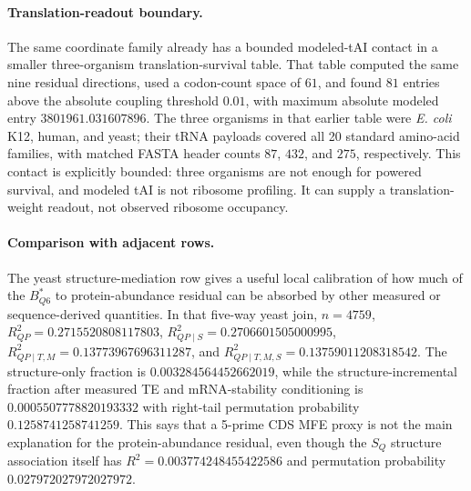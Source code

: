 \paragraph{Translation-readout boundary.}
The same coordinate family already has a bounded modeled-tAI contact in a smaller three-organism translation-survival table.  That table computed the same nine residual directions, used a codon-count space of $61$, and found $81$ entries above the absolute coupling threshold $0.01$, with maximum absolute modeled entry $3801961.031607896$.  The three organisms in that earlier table were \emph{E. coli} K12, human, and yeast; their tRNA payloads covered all 20 standard amino-acid families, with matched FASTA header counts $87$, $432$, and $275$, respectively.  This contact is explicitly bounded: three organisms are not enough for powered survival, and modeled tAI is not ribosome profiling.  It can supply a translation-weight readout, not observed ribosome occupancy.

\paragraph{Comparison with adjacent rows.}
The yeast structure-mediation row gives a useful local calibration of how much of the $B^{*}_{Q6}$ to protein-abundance residual can be absorbed by other measured or sequence-derived quantities.  In that five-way yeast join, $n=4759$, $R^2_{QP}=0.2715520808117803$, $R^2_{QP\mid S}=0.2706601505000995$, $R^2_{QP\mid T,M}=0.13773967696311287$, and $R^2_{QP\mid T,M,S}=0.13759011208318542$.  The structure-only fraction is $0.003284564452662019$, while the structure-incremental fraction after measured TE and mRNA-stability conditioning is $0.0005507778820193332$ with right-tail permutation probability $0.1258741258741259$.  This says that a 5-prime CDS MFE proxy is not the main explanation for the protein-abundance residual, even though the $S_Q$ structure association itself has $R^2=0.003774248455422586$ and permutation probability $0.027972027972027972$.

